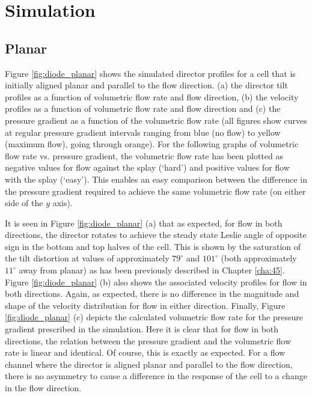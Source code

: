 \section{Simulation}
\subsection{Planar}
Figure \ref{fig:diode_planar} shows the simulated director profiles for a cell that is initially aligned planar and parallel to the flow direction. (a) the director tilt profiles as a function of volumetric flow rate and flow direction, (b) the velocity profiles as a function of volumetric flow rate and flow direction and (c) the pressure gradient as a function of the volumetric flow rate (all figures show curves at regular pressure gradient intervals ranging from blue (no flow) to yellow (maximum flow), going through orange). For the following graphs of volumetric flow rate vs. pressure gradient, the volumetric flow rate has been plotted as negative values for flow against the splay (`hard') and positive values for flow with the splay (`easy'). This enables an easy comparison between the difference in the pressure gradient required to achieve the same volumetric flow rate (on either side of the $y$ axis).

It is seen in Figure \ref{fig:diode_planar} (a) that as expected, for flow in both directions, the director rotates to achieve the steady state Leslie angle of opposite sign in the bottom and top halves of the cell. This is shown by the saturation of the tilt distortion at values of approximately $79^{\circ}$ and $101^{\circ}$ (both approximately $11^{\circ}$ away from planar) as has been previously described in Chapter \ref{cha:45}. Figure \ref{fig:diode_planar} (b) also shows the associated velocity profiles for flow in both directions. Again, as expected, there is no difference in the magnitude and shape of the velocity distribution for flow in either direction. Finally, Figure \ref{fig:diode_planar} (c) depicts the calculated volumetric flow rate for the pressure gradient prescribed in the simulation. Here it is clear that for flow in both directions, the relation between the pressure gradient and the volumetric flow rate is linear and identical. Of course, this is exactly as expected. For a flow channel where the director is aligned planar and parallel to the flow direction, there is no asymmetry to cause a difference in the response of the cell to a change in the flow direction.

